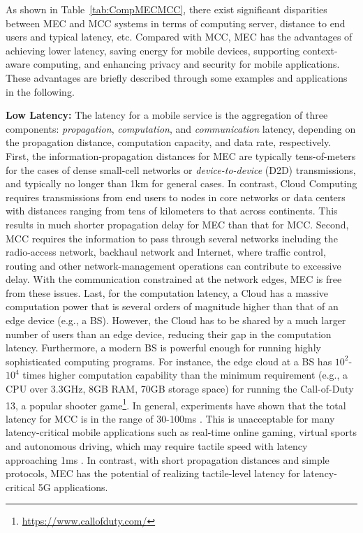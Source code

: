 \documentclass[journal]{IEEEtran}
\begin{document}
As shown in Table~\ref{tab:CompMECMCC}, there exist significant disparities between MEC and MCC systems in terms of computing server, distance to end users and typical latency, etc.
Compared with MCC, MEC has the advantages of achieving lower latency, saving energy for mobile devices, supporting context-aware computing, and enhancing privacy and security for mobile applications. These advantages are briefly described through some examples and applications in the following.

{\bf Low Latency:} The latency for a mobile service is the aggregation of three components: \emph{propagation}, \emph{computation},   and \emph{communication} latency, depending on the propagation distance, computation capacity, and data rate, respectively. First, the information-propagation distances for MEC are typically tens-of-meters for the cases of dense small-cell networks or \emph{device-to-device} (D2D) transmissions, and typically no longer than 1km for general cases. In contrast, Cloud Computing requires transmissions from end users to nodes in core networks or data centers with distances ranging from tens of kilometers to that across continents. This results in much shorter propagation delay for MEC than that for MCC. Second,  MCC requires the information to pass through several networks including the radio-access network, backhaul network and Internet, where traffic control, routing  and other network-management operations can contribute to excessive delay. With the communication constrained at the network edges, MEC is free from  these issues.  Last, for the computation latency, a Cloud has a massive computation power that is several orders of magnitude higher than that of an edge device (e.g., a BS). However, the Cloud has to be shared by a much larger number of users than an edge device, reducing their gap in the computation latency. Furthermore, a modern BS is powerful enough for running highly sophisticated computing programs. For instance, the edge cloud at a BS has $\text{10}^\text{2}$-$\text{10}^\text{4}$ times higher computation capability than the minimum requirement (e.g., a CPU over 3.3GHz, 8GB RAM, 70GB storage space) for running the Call-of-Duty 13, a popular shooter game\footnote{\url{https://www.callofduty.com/}}. In general, experiments have shown that the total latency for MCC is in the range of 30-100ms  \cite{satyanarayanan2009case}. This is unacceptable for many latency-critical mobile applications such as real-time online gaming, virtual sports and autonomous driving, which may require tactile speed with latency approaching 1ms \cite{intelligence2014understanding}. In contrast, with short propagation distances and simple protocols, MEC has the potential of realizing tactile-level latency  for latency-critical 5G applications.
\end{document}
